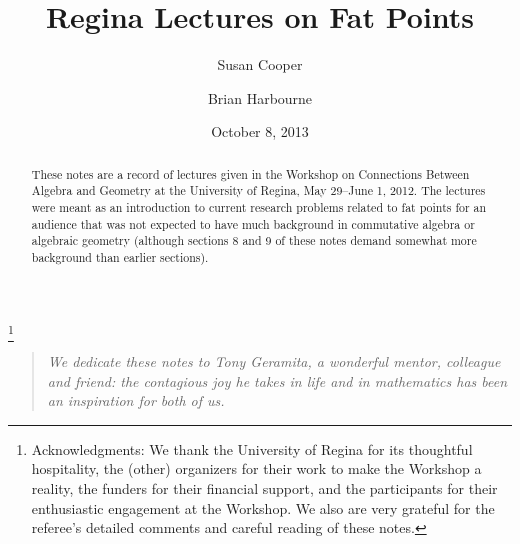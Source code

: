 \documentclass[11pt,twoside]{amsart}
\numberwithin{equation}{section}
\theoremstyle{definition}
\begin{document}
\title[Regina Lectures]{Regina Lectures on Fat Points}

\author{Susan Cooper}
\address{Department of Mathematics\\
Central Michigan University\\
Mount Pleasant, Mich. 48859 USA}

\author{Brian Harbourne}
\address{Department of Mathematics \\
University of Nebraska--Lincoln\\
Lincoln, NE 68588-0130, USA }


\date{October 8, 2013}

\begin{abstract}
These notes are a record of lectures given in the
Workshop on Connections Between Algebra and Geometry
at the University of Regina,
May 29--June 1, 2012. The lectures
were meant as an introduction to current research
problems related to fat points for an audience that was not expected
to have much background in commutative algebra or algebraic geometry
(although sections 8 and 9 of these notes demand somewhat more background
than earlier sections).
\end{abstract}

\thanks{
Acknowledgments: We thank the University of Regina for its thoughtful hospitality,
the (other) organizers for their work to make the Workshop a reality,
the funders for their financial support, and the participants for
their enthusiastic engagement at the Workshop.
We also are very grateful for the referee's detailed comments
and careful reading of these notes.}

\maketitle

\tableofcontents

\begin{quotation}
\begin{center}
\emph{We dedicate these notes to Tony Geramita, a wonderful mentor, colleague and friend:
the contagious joy he takes in life and in mathematics has been an inspiration for both of us.}
\end{center}
\end{quotation}
\end{document}
